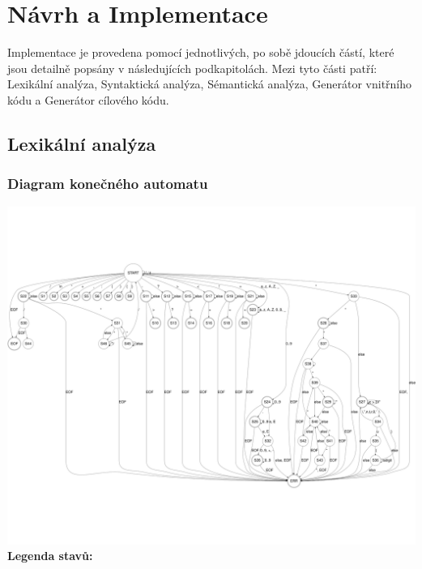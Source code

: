 \documentclass[12pt]{article}
\begin{document}
\section{Návrh a Implementace}
Implementace je provedena pomocí jednotlivých, po sobě jdoucích částí, které jsou detailně popsány v následujících podkapitolách. Mezi tyto části patří: Lexikální analýza, Syntaktická analýza, Sémantická analýza, Generátor vnitřního kódu a Generátor cílového kódu. 

\subsection{Lexikální analýza}

\subsubsection{Diagram konečného automatu}
\includegraphics{img/ifj-fsm.png}
\\
\textbf{Legenda stavů:}\\
\end{document}
